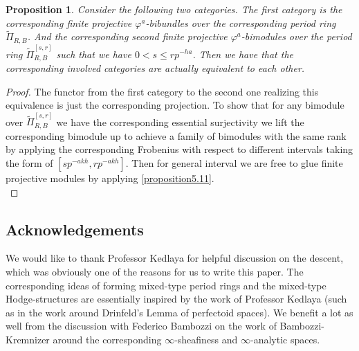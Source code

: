 \documentclass[12pt]{amsart}
\newtheorem{proposition}[theorem]{Proposition}
\theoremstyle{definition}
\numberwithin{equation}{section}
\begin{document}
\begin{proposition} \label{proposition5.13}
Consider the following two categories. The first category is the corresponding finite projective $\varphi^a$-bibundles over the corresponding period ring $\widetilde{\Pi}_{R,B}$. And the corresponding second finite projective $\varphi^a$-bimodules over the period ring $\widetilde{\Pi}^{[s,r]}_{R,B}$	such that we have $0<s\leq rp^{-ha}$. Then we have that the corresponding involved categories are actually equivalent to each other.
\end{proposition}

\begin{proof}
The functor from the first category to the second one realizing this equivalence is just the corresponding projection. To show that for any bimodule over $\widetilde{\Pi}^{[s,r]}_{R,B}$ we have the corresponding essential surjectivity we lift the corresponding bimodule up to achieve a family of bimodules with the same rank by applying the corresponding Frobenius with respect to different intervals taking the form of $[sp^{-akh},rp^{-akh}]$. Then for general interval we are free to glue finite projective modules by applying \cref{proposition5.11}.\\
\end{proof}











































\newpage

\subsection*{Acknowledgements} 

We would like to thank Professor Kedlaya for helpful discussion on the descent, which was obviously one of the reasons for us to write this paper. The corresponding ideas of forming mixed-type period rings and the mixed-type Hodge-structures are essentially inspired by the work of Professor Kedlaya (such as in the work around Drinfeld's Lemma of perfectoid spaces). We benefit a lot as well from the discussion with Federico Bambozzi on the work of Bambozzi-Kremnizer around the corresponding $\infty$-sheafiness and $\infty$-analytic spaces.
\end{document}
